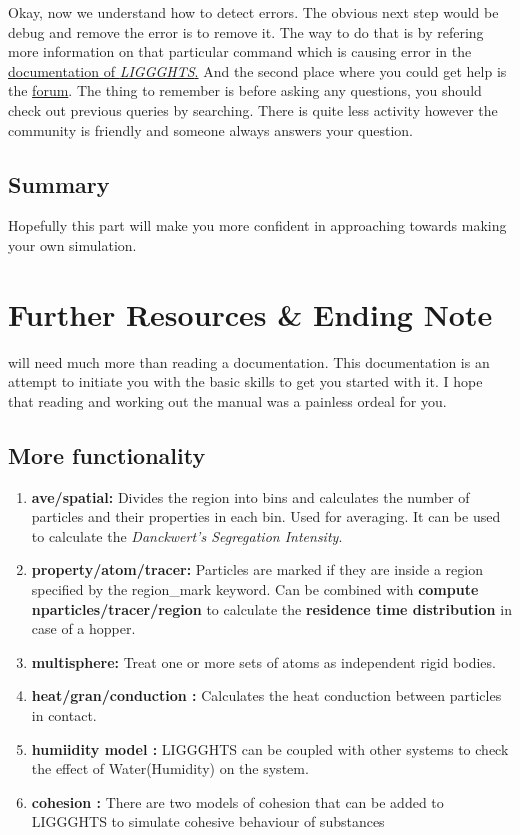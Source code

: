 \documentclass{tufte-book} %
\newcommand{\Li}{\textit{LIGGGHTS}\xspace}
\begin{document}
Okay, now we understand how to detect errors. The obvious next step would be debug and remove the error is to remove it. The way to do that is by refering more information on that particular command which is causing error in the \href{http://www.cfdem.com/media/DEM/docu/Section_commands.html#comm}{documentation of \Li.}
And the second place where you could get help is the \href{http://www.cfdem.com/forum}{forum}. The thing to remember is before asking any questions, you should check out previous queries by searching. There is quite less activity however the community is friendly and someone always answers your question.
\section{Summary}

Hopefully this part will make you more confident in approaching towards making your own simulation.

\chapter{Further Resources \& Ending Note}
\label{chap:4}

\begin{fullwidth}
  \newthought{Learning to work with \Li} will need much more than reading a documentation. This documentation is an attempt to initiate you with the basic skills to get you started with it. I hope that reading and working out the manual was a painless ordeal for you.  
\end{fullwidth}

\section{More functionality}
\begin{enumerate}
\item \textbf{ave/spatial:} Divides the region into bins and calculates the number of particles and their properties in each bin. Used for averaging. It can be used to calculate the \textit{Danckwert's Segregation Intensity}.
\item \textbf{property/atom/tracer: } Particles are marked if they are inside a region specified by the region\_mark keyword. Can be combined with \textbf{compute nparticles/tracer/region} to calculate the \textbf{residence time distribution} in case of a hopper.
\item \textbf{multisphere: } Treat one or more sets of atoms as independent rigid bodies.
\item \textbf{heat/gran/conduction :} Calculates the heat conduction between particles in contact.
\item \textbf{humiidity model :} LIGGGHTS can be coupled with other systems to check the effect of Water(Humidity) on the system.
\item \textbf{cohesion : } There are two models of cohesion that can be added to LIGGGHTS to simulate cohesive behaviour of substances
\end{enumerate}
\end{document}
